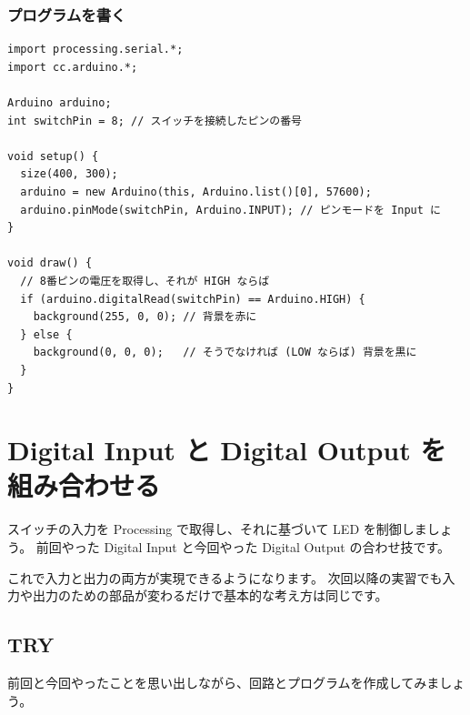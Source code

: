 \documentclass[11pt,a4paper]{jarticle}
\begin{document}
\subsubsection{プログラムを書く}
\begin{lstlisting}
import processing.serial.*;
import cc.arduino.*;

Arduino arduino;
int switchPin = 8; // スイッチを接続したピンの番号
 
void setup() {
  size(400, 300);
  arduino = new Arduino(this, Arduino.list()[0], 57600);
  arduino.pinMode(switchPin, Arduino.INPUT); // ピンモードを Input に
}
 
void draw() {
  // 8番ピンの電圧を取得し、それが HIGH ならば
  if (arduino.digitalRead(switchPin) == Arduino.HIGH) {
    background(255, 0, 0); // 背景を赤に
  } else {
    background(0, 0, 0);   // そうでなければ (LOW ならば) 背景を黒に
  }
}
\end{lstlisting}

\section{Digital Input と Digital Output を組み合わせる}
スイッチの入力を Processing で取得し、それに基づいて LED を制御しましょう。
前回やった Digital Input と今回やった Digital Output の合わせ技です。

これで入力と出力の両方が実現できるようになります。
次回以降の実習でも入力や出力のための部品が変わるだけで基本的な考え方は同じです。

\subsection*{TRY}
前回と今回やったことを思い出しながら、回路とプログラムを作成してみましょう。
\end{document}
